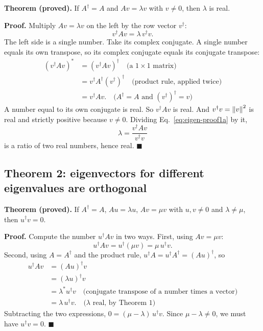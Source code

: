 \textbf{Theorem (proved).} If $A^\dagger=A$ and $Av=\lambda v$ with $v\ne0$, then $\lambda$ is real.

\textbf{Proof.} Multiply $Av=\lambda v$ on the left by the row vector $v^\dagger$:
\begin{equation}
v^\dagger Av=\lambda\,v^\dagger v.
\label{eq:eigen-proof1a}
\end{equation}
The left side is a single number. Take its complex conjugate. A single number equals its own transpose, so its complex conjugate equals its conjugate transpose:
\begin{align}
(v^\dagger Av)^*&=(v^\dagger Av)^\dagger\quad\text{(a $1\times1$ matrix)}\\
&=v^\dagger A^\dagger (v^\dagger)^\dagger\quad\text{(product rule, applied twice)}\\
&=v^\dagger A v.\quad\text{(}A^\dagger=A\text{ and }(v^\dagger)^\dagger=v)
\end{align}
A number equal to its own conjugate is real. So $v^\dagger Av$ is real. And $v^\dagger v=\left\lVert v\right\rVert^2$ is real and strictly positive because $v\ne0$. Dividing Eq.~\eqref{eq:eigen-proof1a} by it,
\begin{equation}
\lambda=\frac{v^\dagger Av}{v^\dagger v}
\label{eq:eigen-rayleigh-eig}
\end{equation}
is a ratio of two real numbers, hence real. $\blacksquare$

\subsection{Theorem 2: eigenvectors for different eigenvalues are orthogonal}

\textbf{Theorem (proved).} If $A^\dagger=A$, $Au=\lambda u$, $Av=\mu v$ with $u,v\ne0$ and $\lambda\ne\mu$, then $u^\dagger v=0$.

\textbf{Proof.} Compute the number $u^\dagger Av$ in two ways. First, using $Av=\mu v$:
\begin{equation}
u^\dagger Av=u^\dagger(\mu v)=\mu\,u^\dagger v.
\end{equation}
Second, using $A=A^\dagger$ and the product rule, $u^\dagger A=u^\dagger A^\dagger=(Au)^\dagger$, so
\begin{align}
u^\dagger Av&=(Au)^\dagger v\\
&=(\lambda u)^\dagger v\\
&=\lambda^*u^\dagger v\quad\text{(conjugate transpose of a number times a vector)}\\
&=\lambda\,u^\dagger v.\quad\text{(}\lambda\text{ real, by Theorem 1)}
\end{align}
Subtracting the two expressions, $0=(\mu-\lambda)\,u^\dagger v$. Since $\mu-\lambda\ne0$, we must have $u^\dagger v=0$. $\blacksquare$

